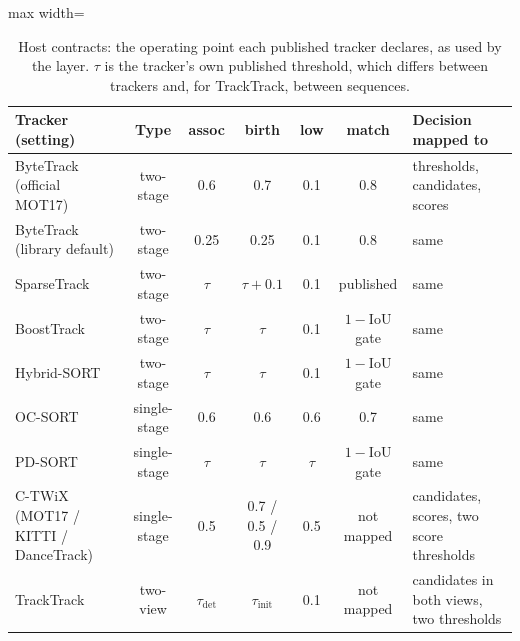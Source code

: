 \begin{table}[tbp]
\centering
\caption{Host contracts: the operating point each published tracker declares, as used by the layer. $\tau$ is the tracker's own published threshold, which differs between trackers and, for TrackTrack, between sequences.}
\label{tab:ch5-contracts}
\small\setlength{\tabcolsep}{4pt}
\begin{adjustbox}{max width=\textwidth}
\begin{tabular}{>{\raggedright\arraybackslash}p{3.4cm}ccccc>{\raggedright\arraybackslash}p{3.6cm}}
\hline
Tracker (setting) & Type & assoc & birth & low & match & Decision mapped to \\
\hline
ByteTrack (official MOT17) & two-stage & 0.6 & 0.7 & 0.1 & 0.8 & thresholds, candidates, scores \\
ByteTrack (library default) & two-stage & 0.25 & 0.25 & 0.1 & 0.8 & same \\
SparseTrack & two-stage & $\tau$ & $\tau+0.1$ & 0.1 & published & same \\
BoostTrack & two-stage & $\tau$ & $\tau$ & 0.1 & $1-$IoU gate & same \\
Hybrid-SORT & two-stage & $\tau$ & $\tau$ & 0.1 & $1-$IoU gate & same \\
OC-SORT & single-stage & 0.6 & 0.6 & 0.6 & 0.7 & same \\
PD-SORT & single-stage & $\tau$ & $\tau$ & $\tau$ & $1-$IoU gate & same \\
C-TWiX (MOT17 / KITTI / DanceTrack) & single-stage & 0.5 & 0.7 / 0.5 / 0.9 & 0.5 & not mapped & candidates, scores, two score thresholds \\
TrackTrack & two-view & $\tau_{\mathrm{det}}$ & $\tau_{\mathrm{init}}$ & 0.1 & not mapped & candidates in both views, two thresholds \\
\hline
\end{tabular}
\end{adjustbox}
\end{table}
